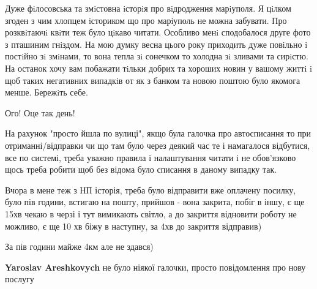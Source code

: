  
 
 
 
 

\qqSecCmt


Дуже фiлосовська та змiстовна iсторiя про вiдродження марiуполя. Я цiлком
згоден з чим хлопцем iсториком що про марiуполь не можна забувати. Про
розквiтаючi квiти теж було цiкаво читати. Особливо менi сподобалося друге фото
з пташиним гнiздом. На мою думку весна цього року приходить дуже повiльно i
постiйно зi змiнами, то вона тепла зi сонечком то холодна зi зливами та
сирiстю. На останок хочу вам побажати тiльки добрих та хороших новин у вашому
життi i щоб таких негативних випадкiв от як з банком та новою поштою було
якомога менше. Бережiть себе.


Ого! Оце так день!


На рахунок "просто йшла по вулиці", якщо була галочка про автосписання то при
отриманні/відправки чи що там було через деякий час те і намагалося відбутися,
все по системі, треба уважно правила і налаштування читати і не обов'язково
щось треба робити щоб без відома було списання в даному випадку так.

Вчора в мене теж з НП історія, треба було відправити вже оплачену посилку, було
пів години, встигаю на пошту, прийшов - вона закрита, побіг в іншу, є ще 15хв
чекаю в черзі і тут вимикають світло, а до закриття відновити роботу не
можливо, є ще 10 хв біжу в наступну, за 4хв до закриття відправив)

За пів години майже 4км але не здався)

\begin{itemize} %
\textbf{Yaroslav Areshkovych} не було ніякої галочки, просто повідомлення про нову послугу
\end{itemize} %

